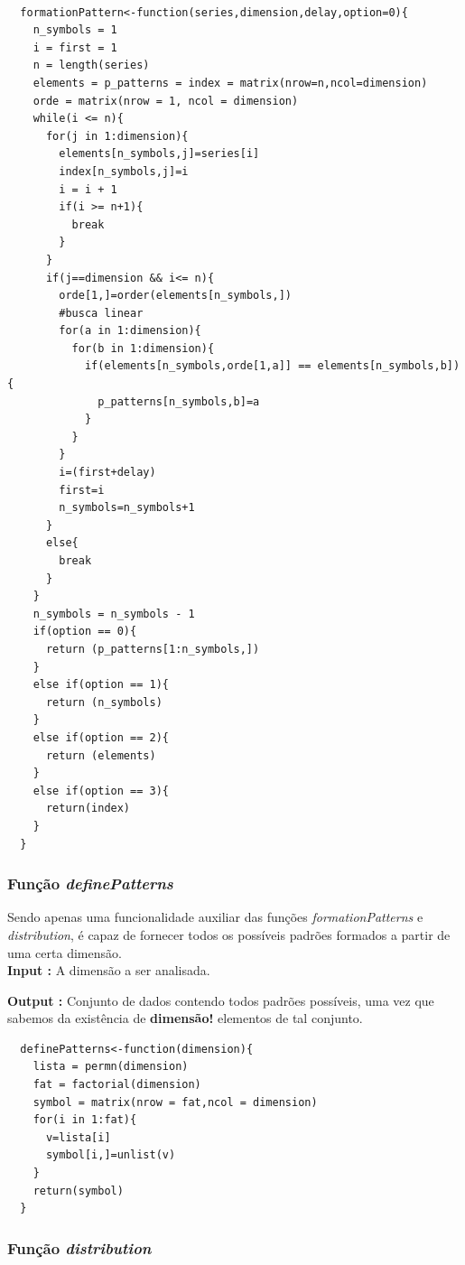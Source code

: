 \documentclass[12pt,letterpaper]{article}
\begin{document}
\begin{lstlisting}

  formationPattern<-function(series,dimension,delay,option=0){ 
    n_symbols = 1
    i = first = 1
    n = length(series)
    elements = p_patterns = index = matrix(nrow=n,ncol=dimension)
    orde = matrix(nrow = 1, ncol = dimension)    
    while(i <= n){      
      for(j in 1:dimension){
        elements[n_symbols,j]=series[i]
        index[n_symbols,j]=i
        i = i + 1
        if(i >= n+1){
          break
        }
      }      
      if(j==dimension && i<= n){ 
        orde[1,]=order(elements[n_symbols,])
        #busca linear
        for(a in 1:dimension){
          for(b in 1:dimension){
            if(elements[n_symbols,orde[1,a]] == elements[n_symbols,b]){
              p_patterns[n_symbols,b]=a
            }
          }
        }
        i=(first+delay)
        first=i
        n_symbols=n_symbols+1
      }      
      else{
        break
      }
    }
    n_symbols = n_symbols - 1
    if(option == 0){
      return (p_patterns[1:n_symbols,])
    }
    else if(option == 1){
      return (n_symbols)
    }
    else if(option == 2){
      return (elements)
    }
    else if(option == 3){
      return(index)
    }
  }
\end{lstlisting}

\subsubsection{Função \textit{definePatterns}}

Sendo apenas uma funcionalidade auxiliar das funções \textit{formationPatterns} e \textit{distribution}, é capaz de fornecer todos os possíveis padrões formados a partir de uma certa dimensão.\\

\textbf{Input :} A dimensão a ser analisada.

\textbf{Output :} Conjunto de dados contendo todos padrões possíveis, uma vez que sabemos da existência de \textbf{dimensão!} elementos de tal conjunto.\\

\begin{lstlisting}
  definePatterns<-function(dimension){
    lista = permn(dimension) 
    fat = factorial(dimension)
    symbol = matrix(nrow = fat,ncol = dimension)
    for(i in 1:fat){
      v=lista[i]
      symbol[i,]=unlist(v)
    }
    return(symbol)
  }  
\end{lstlisting}

\subsubsection{Função \textit{distribution}}
\end{document}
